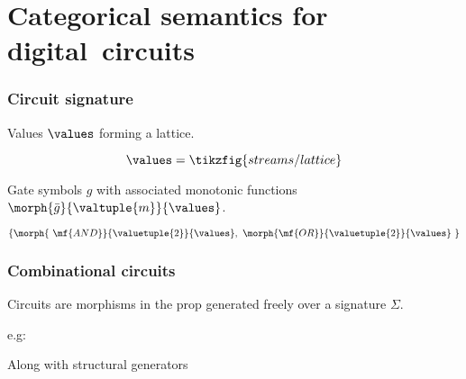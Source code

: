 \section{Categorical semantics for digital~circuits}

\begin{frame}
    \frametitle{Circuit signature}

    \pause

    \alert{Values} \(\values\) forming a lattice.

    \pause

    \[\values = \tikzfig{streams/lattice}\]

    \pause

    \alert{Gate symbols} \(g\) with associated monotonic functions \(\morph{\bar{g}}{\valtuple{m}}{\values}\).

    \pause

    \[\{\morph{\ \mf{AND}}{\valuetuple{2}}{\values},\ \morph{\mf{OR}}{\valuetuple{2}}{\values}\ \}\]

\end{frame}

\begin{frame}
    \frametitle{Combinational circuits}

    \pause

    Circuits are \alert{morphisms} in the prop generated freely over a signature \(\Sigma\).

    \pause

    e.g:

    \begin{center}

        \pause

        \vspace{1em}

    \end{center}

    \vspace{1em}

    \pause

    Along with \alert{structural} generators 

    \begin{center}
        \quad
        \quad
    \end{center}

\end{frame}

